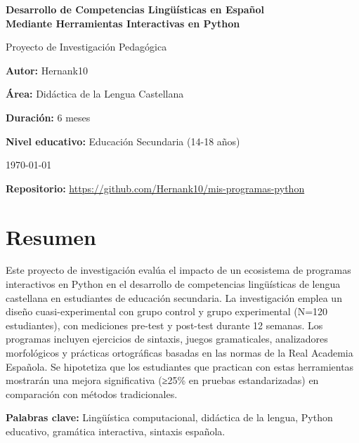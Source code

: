 \documentclass[12pt,spanish]{article}
\newcommand{\autor}{Hernank10}
\newcommand{\titulo}{Desarrollo de Competencias Lingüísticas en Español \\
Mediante Herramientas Interactivas en Python}
\begin{document}
\begin{titlepage}
    \centering
    \vspace*{2cm}
    {\Huge \textbf{\titulo} \par}
    \vspace{1cm}
    {\Large Proyecto de Investigación Pedagógica \par}
    \vspace{1.5cm}
    {\large \textbf{Autor:} \autor \par}
    \vspace{0.5cm}
    {\large \textbf{Área:} Didáctica de la Lengua Castellana \par}
    \vspace{0.5cm}
    {\large \textbf{Duración:} 6 meses \par}
    \vspace{0.5cm}
    {\large \textbf{Nivel educativo:} Educación Secundaria (14-18 años) \par}
    \vspace{2cm}
    {\large \today \par}
    \vfill
    {\large \textbf{Repositorio:} \url{https://github.com/Hernank10/mis-programas-python} \par}
\end{titlepage}

\section*{Resumen}

Este proyecto de investigación evalúa el impacto de un ecosistema de programas interactivos en Python en el desarrollo de competencias lingüísticas de lengua castellana en estudiantes de educación secundaria. La investigación emplea un diseño cuasi-experimental con grupo control y grupo experimental (N=120 estudiantes), con mediciones pre-test y post-test durante 12 semanas. Los programas incluyen ejercicios de sintaxis, juegos gramaticales, analizadores morfológicos y prácticas ortográficas basadas en las normas de la Real Academia Española. Se hipotetiza que los estudiantes que practican con estas herramientas mostrarán una mejora significativa (≥25\% en pruebas estandarizadas) en comparación con métodos tradicionales.

\textbf{Palabras clave:} Lingüística computacional, didáctica de la lengua, Python educativo, gramática interactiva, sintaxis española.

\newpage
\end{document}
